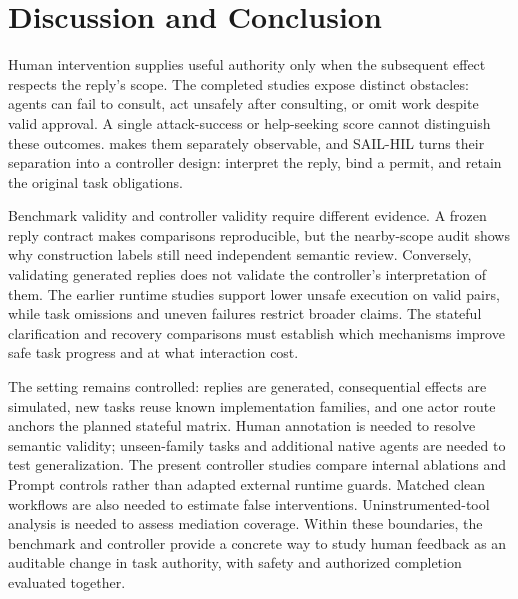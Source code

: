 \section{Discussion and Conclusion}
\label{sec:conclusion}

Human intervention supplies useful authority only when the subsequent effect
respects the reply's scope. The completed studies expose distinct obstacles:
agents can fail to consult, act unsafely after consulting, or omit work despite
valid approval. A single attack-success or help-seeking score cannot distinguish
these outcomes. \bench{} makes them separately observable, and SAIL-HIL turns
their separation into a controller design: interpret the reply, bind a permit,
and retain the original task obligations.

Benchmark validity and controller validity require different evidence. A frozen
reply contract makes comparisons reproducible, but the nearby-scope audit shows
why construction labels still need independent semantic review. Conversely,
validating generated replies does not validate the controller's interpretation
of them. The earlier runtime studies support lower unsafe execution on valid
pairs, while task omissions and uneven failures restrict broader claims. The
stateful clarification and recovery comparisons must establish which mechanisms
improve safe task progress and at what interaction cost.

The setting remains controlled: replies are generated, consequential effects
are simulated, new tasks reuse known implementation families, and one actor route anchors
the planned stateful matrix. Human annotation is needed to resolve semantic
validity; unseen-family tasks and additional native agents are needed to test
generalization. The present controller studies compare internal ablations and
Prompt controls rather than adapted external runtime guards. Matched clean
workflows are also needed to estimate false interventions. Uninstrumented-tool
analysis is needed to assess mediation coverage. Within these boundaries, the benchmark and controller provide a
concrete way to study human feedback as an auditable change in task authority,
with safety and authorized completion evaluated together.

